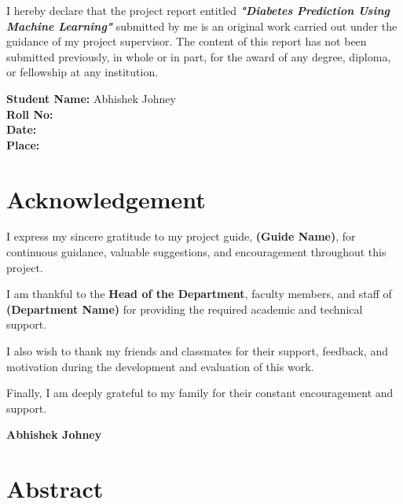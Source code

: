\documentclass[12pt,a4paper]{report}
\begin{document}
I hereby declare that the project report entitled \textbf{\textit{"Diabetes Prediction Using Machine Learning"}} submitted by me is an original work carried out under the guidance of my project supervisor. The content of this report has not been submitted previously, in whole or in part, for the award of any degree, diploma, or fellowship at any institution.

\vspace{2cm}
\textbf{Student Name:} Abhishek Johney\\
\textbf{Roll No:} \underline{\hspace{4cm}}\\
\textbf{Date:} \underline{\hspace{4cm}}\\
\textbf{Place:} \underline{\hspace{4cm}}

\newpage

\chapter*{Acknowledgement}

I express my sincere gratitude to my project guide, \textbf{(Guide Name)}, for continuous guidance, valuable suggestions, and encouragement throughout this project.

I am thankful to the \textbf{Head of the Department}, faculty members, and staff of \textbf{(Department Name)} for providing the required academic and technical support.

I also wish to thank my friends and classmates for their support, feedback, and motivation during the development and evaluation of this work.

Finally, I am deeply grateful to my family for their constant encouragement and support.

\vspace{2cm}
\begin{flushright}
\textbf{Abhishek Johney}
\end{flushright}

\newpage

\chapter*{Abstract}
\end{document}

